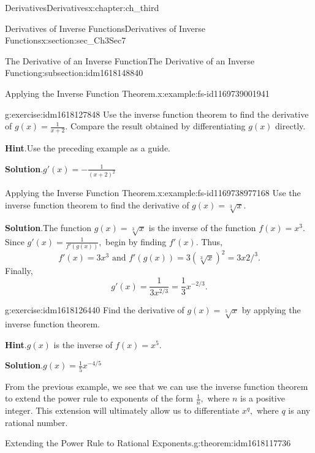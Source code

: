 \documentclass[oneside,10pt,]{book}
\newcommand{\blocktitlefont}{\relax}
\numberwithin{equation}{section}
\begin{document}
\begin{chapterptx}{Derivatives}{}{Derivatives}{}{}{x:chapter:ch_third}
\begin{sectionptx}{Derivatives of Inverse Functions}{}{Derivatives of Inverse Functions}{}{}{x:section:sec_Ch3Sec7}
\begin{subsectionptx}{The Derivative of an Inverse Function}{}{The Derivative of an Inverse Function}{}{}{g:subsection:idm1618148840}
\begin{example}{Applying the Inverse Function Theorem.}{x:example:fs-id1169739001941}
\end{example}
\begin{inlineexercise}{}{g:exercise:idm1618127848}%
Use the inverse function theorem to find the derivative of \(g(x)=\frac{1}{x+2}.\) Compare the result obtained by differentiating \(g(x)\) directly.%
\par\smallskip%
\noindent\textbf{\blocktitlefont Hint}.\hypertarget{g:hint:idm1618130920}{}\quad{}Use the preceding example as a guide.%
\par\smallskip%
\noindent\textbf{\blocktitlefont Solution}.\hypertarget{g:solution:idm1618129640}{}\quad{}\(g'(x)=-\frac{1}{(x+2)^2}\)%
\end{inlineexercise}%
\begin{example}{Applying the Inverse Function Theorem.}{x:example:fs-id1169738977168}%
Use the inverse function theorem to find the derivative of \(g(x)=\sqrt[3]{x}.\)%
\par\smallskip%
\noindent\textbf{\blocktitlefont Solution}.\hypertarget{g:solution:idm1618124136}{}\quad{}The function \(g(x)=\sqrt[3]{x}\) is the inverse of the function \(f(x)=x^3.\) Since \(g'(x)=\frac{1}{f'(g(x))},\) begin by finding \(f'(x).\) Thus,%
%
\begin{equation*}
f'(x)=3x^3 \text{ and } f'(g(x))=3(\sqrt[3]{x})^2=3x2/^3.
\end{equation*}
Finally,%
%
\begin{equation*}
g'(x)=\frac{1}{3x^{2/3}}=\frac{1}{3}x^{-2/3}.
\end{equation*}
\end{example}
\begin{inlineexercise}{}{g:exercise:idm1618126440}%
Find the derivative of \(g(x)=\sqrt[5]{x}\) by applying the inverse function theorem.%
\par\smallskip%
\noindent\textbf{\blocktitlefont Hint}.\hypertarget{g:hint:idm1618121064}{}\quad{}\(g(x)\) is the inverse of \(f(x)=x^5.\)%
\par\smallskip%
\noindent\textbf{\blocktitlefont Solution}.\hypertarget{g:solution:idm1618122344}{}\quad{}\(g(x)=\frac{1}{5}x^{-4/5}\)%
\end{inlineexercise}%
From the previous example, we see that we can use the inverse function theorem to extend the power rule to exponents of the form \(\frac{1}{n},\) where \(n\) is a positive integer. This extension will ultimately allow us to differentiate \(x^q,\) where \(q\) is any rational number.%
\begin{theorem}{Extending the Power Rule to Rational Exponents.}{}{g:theorem:idm1618117736}%

\end{theorem}
\end{subsectionptx}
\end{sectionptx}
\end{chapterptx}
\end{document}
